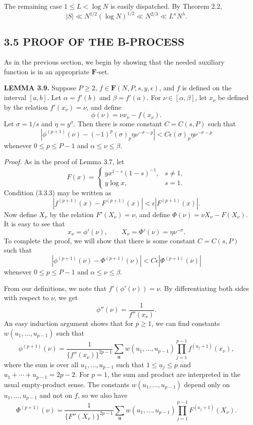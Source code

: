 \documentclass[10pt]{article}
\newcommand{\Fclass}{\mathbf{F}}
\begin{document}
The remaining case $1\leq L<\log N$ is easily dispatched. By Theorem 2.2,
\[
 |S|\ll N^{1/2}(\log N)^{1/2}\ll N^{2/3}
 \ll L^\kappa N^\lambda.
\]

\subsection*{3.5 PROOF OF THE B-PROCESS}

As in the previous section, we begin by showing that the needed auxiliary
function is in an appropriate $\Fclass$-set.

\medskip
\noindent\textbf{LEMMA 3.9.}
Suppose $P\geq2$, $f\in\Fclass(N,P,s,y,\epsilon)$, and $f$ is defined on the
interval $[a,b]$. Let $\alpha=f'(b)$ and $\beta=f'(a)$. For
$\nu\in[\alpha,\beta]$, let $x_\nu$ be defined by the relation
$f'(x_\nu)=\nu$, and define
\[
 \phi(\nu)=\nu x_\nu-f(x_\nu).
\]
Let $\sigma=1/s$ and $\eta=y^\sigma$. Then there is some constant
$C=C(s,P)$ such that
\[
 \left|\phi^{(p+1)}(\nu)-(-1)^p(\sigma)_p\eta\nu^{-\sigma-p}\right|
 <C\epsilon(\sigma)_p\eta\nu^{-\sigma-p}
\]
whenever $0\leq p\leq P-1$ and $\alpha\leq\nu\leq\beta$.

\noindent\textit{Proof.}
As in the proof of Lemma 3.7, let
\[
 F(x)=
 \begin{cases}
  yx^{1-s}(1-s)^{-1},&s\neq1,\\
  y\log x,&s=1.
 \end{cases}
\]
Condition (3.3.3) may be written as
\begin{equation*}
 |f^{(p+1)}(x)-F^{(p+1)}(x)|
 <\epsilon|F^{(p+1)}(x)|. \tag{3.5.1}
\end{equation*}
Now define $X_\nu$ by the relation $F'(X_\nu)=\nu$, and define
$\Phi(\nu)=\nu X_\nu-F(X_\nu)$. It is easy to see that
\[
 x_\nu=\phi'(\nu),
 \qquad
 X_\nu=\Phi'(\nu)=\eta\nu^{-\sigma}.
\]
To complete the proof, we will show that there is some constant $C=C(s,P)$
such that
\begin{equation*}
 |\phi^{(p+1)}(\nu)-\Phi^{(p+1)}(\nu)|
 <C\epsilon|\Phi^{(p+1)}(\nu)| \tag{3.5.2}
\end{equation*}
whenever $0\leq p\leq P-1$ and $\alpha\leq\nu\leq\beta$.

From our definitions, we note that $f'(\phi'(\nu))=\nu$. By differentiating
both sides with respect to $\nu$, we get
\[
 \phi''(\nu)=\frac1{f''(x_\nu)}.
\]
An easy induction argument shows that for $p\geq1$, we can find constants
$w(u_1,\ldots,u_{p-1})$ such that
\begin{equation*}
 \phi^{(p+1)}(\nu)
 =\frac{1}{\{f''(x_\nu)\}^{2p-1}}
  \sum_{\mathbf u}w(u_1,\ldots,u_{p-1})
  \prod_{j=1}^{p-1}f^{(u_j+1)}(x_\nu), \tag{3.5.3}
\end{equation*}
where the sum is over all $u_1,\ldots,u_{p-1}$ such that
$1\leq u_j\leq p$ and $u_1+\cdots+u_{p-1}=2p-2$. For $p=1$, the sum and
product are interpreted in the usual empty-product sense. The constants
$w(u_1,\ldots,u_{p-1})$ depend only on $u_1,\ldots,u_{p-1}$ and not on $f$,
so we also have
\begin{equation*}
 \Phi^{(p+1)}(\nu)
 =\frac{1}{\{F''(X_\nu)\}^{2p-1}}
  \sum_{\mathbf u}w(u_1,\ldots,u_{p-1})
  \prod_{j=1}^{p-1}F^{(u_j+1)}(X_\nu). \tag{3.5.4}
\end{equation*}
\end{document}
